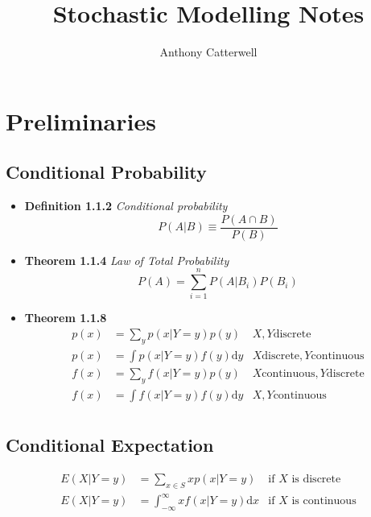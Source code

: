 \documentclass[11pt,a4paper]{article}
\title{Stochastic Modelling Notes}
\author{Anthony Catterwell}
\begin{document}
\maketitle
\tableofcontents

\break{}

\section{Preliminaries}

\subsection{Conditional Probability}

\begin{itemize}

    \item \textbf{Definition 1.1.2} \emph{Conditional probability}
        \[
            P(A|B) \equiv \frac{P(A \cap B)}{P(B)}
        \]

    \item \textbf{Theorem 1.1.4} \emph{Law of Total Probability}
        \[
            P(A) = \sum_{i=1}^n P(A|B_i)P(B_i)
        \]
    \item \textbf{Theorem 1.1.8}
        \begin{align*}{}
            p(x) &= \sum_y p(x|Y=y)p(y)            & X, Y \text{discrete} \\
            p(x) &= \int   p(x|Y=y)f(y)\mathrm{d}y & X \text{discrete}, Y \text{continuous} \\
            f(x) &= \sum_y f(x|Y=y)p(y)            & X\text{continuous}, Y \text{discrete} \\
            f(x) &= \int   f(x|Y=y)f(y)\mathrm{d}y & X, Y \text{continuous} \\
        \end{align*}
\end{itemize}

\subsection{Conditional Expectation}

\begin{align*}{}
    E(X|Y = y) &= \sum_{x \in S} xp(x|Y=y) &\text{if $X$ is discrete} \\
    E(X|Y = y) &= \int_{-\infty}^{\infty} xf(x|Y=y)\mathrm{d}x &\text{if $X$ is continuous}
\end{align*}
\end{document}
